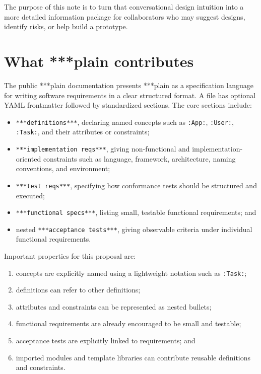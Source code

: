 \documentclass[11pt]{article}
\begin{document}
The purpose of this note is to turn that conversational design intuition into a
more detailed information package for collaborators who may suggest designs,
identify risks, or help build a prototype.

\section{What ***plain contributes}

The public ***plain documentation presents ***plain as a specification language
for writing software requirements in a clear structured format.  A file has
optional YAML frontmatter followed by standardized sections.  The core sections
include:
\begin{itemize}
  \item \texttt{***definitions***}, declaring named concepts such as
        \texttt{:App:}, \texttt{:User:}, \texttt{:Task:}, and their attributes
        or constraints;
  \item \texttt{***implementation reqs***}, giving non-functional and
        implementation-oriented constraints such as language, framework,
        architecture, naming conventions, and environment;
  \item \texttt{***test reqs***}, specifying how conformance tests should be
        structured and executed;
  \item \texttt{***functional specs***}, listing small, testable functional
        requirements; and
  \item nested \texttt{***acceptance tests***}, giving observable criteria under
        individual functional requirements.
\end{itemize}

Important properties for this proposal are:
\begin{enumerate}
  \item concepts are explicitly named using a lightweight notation such as
        \texttt{:Task:};
  \item definitions can refer to other definitions;
  \item attributes and constraints can be represented as nested bullets;
  \item functional requirements are already encouraged to be small and
        testable;
  \item acceptance tests are explicitly linked to requirements; and
  \item imported modules and template libraries can contribute reusable
        definitions and constraints.
\end{enumerate}
\end{document}
